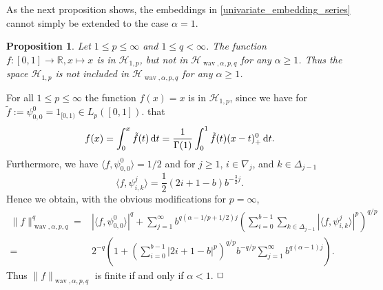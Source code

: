 \documentclass[12pt]{article}
\DeclareMathOperator{\wav}{wav}
\newtheorem{proposition}{Proposition}
\newenvironment{proof}{\begin{trivlist}
    \item[\hskip\labelsep{\it Proof.}]}{$\hfill\Box$\end{trivlist}}
\newcommand{\RR}{\mathbb{R}}
\newcommand{\HH}{\mathcal{H}}
\newcommand{\red}[1]{\textcolor{red}{#1}}
\begin{document}
As the next proposition shows, the embeddings in \eqref{univariate_embedding_series} 
cannot simply be extended to the case $\alpha =1$.

\begin{proposition}\label{prop1}
Let $1\le p \le \infty$ and $1\le q < \infty$. The function $f:[0,1]\to \RR, x\mapsto x$ is in $\HH_{1,p}$, but not in
$\HH_{\wav,\alpha,p,q}$ for any
$\alpha \ge 1$. Thus the space $\HH_{1,p}$
is not included in $\HH_{\wav,\alpha,p,q}$ for any $\alpha\ge 1$.
\end{proposition}


\begin{proof}
For all $1\le p \le \infty$ the function $f(x)=x$ is in $\HH_{1,p}$,
since we have for $\tilde{f} :=\psi^0_{0,0} =1_{[0,1)} \in L_p([0,1]).$ that
\begin{equation*}
f(x) = \int^x_0 \tilde{f}(t) \,{\rm d}t
= \frac{1}{\Gamma(1)} \int^1_0 \tilde{f}(t)(x-t)^{0}_+ \,{\rm d}t.
\end{equation*}
Furthermore, we have $\langle f, \psi^0_{0,0} \rangle = 1/2$
and for $j\ge 1$, $i\in\nabla_j$, and $k\in\Delta_{j-1}$
$$\langle f, \psi^j_{i,k} \rangle =
\frac{1}{2} (2i+1-b)b^{-\frac{3}{2}j}.$$
Hence we obtain, with the obvious modifications for $p=\infty$,
\begin{equation*}
\begin{split}
\|f\|^{q}_{\wav,\alpha, p,q} =& | \langle f, \psi^0_{0,0} \rangle|^{q}
+ \sum_{j=1}^\infty b^{q(\alpha-1/p+1/2) j} \left( \sum^{b-1}_{i=0}
\sum_{k\in\Delta_{j-1}} |\langle f, \psi^j_{i,k} \rangle|^{p} \right)^{q/p}\\
=& 2^{-q}  \left( 1 + \left( \sum^{b-1}_{i=0} |2i+1-b|^{p} \right)^{q/p}
b^{-q/p} \sum_{j=1}^\infty b^{q(\alpha - 1)j} \right).
\end{split}
\end{equation*}
Thus $\|f\|_{\wav,\alpha,p,q}$ is finite if and only if $\alpha <1$.
\end{proof}


\end{document}
